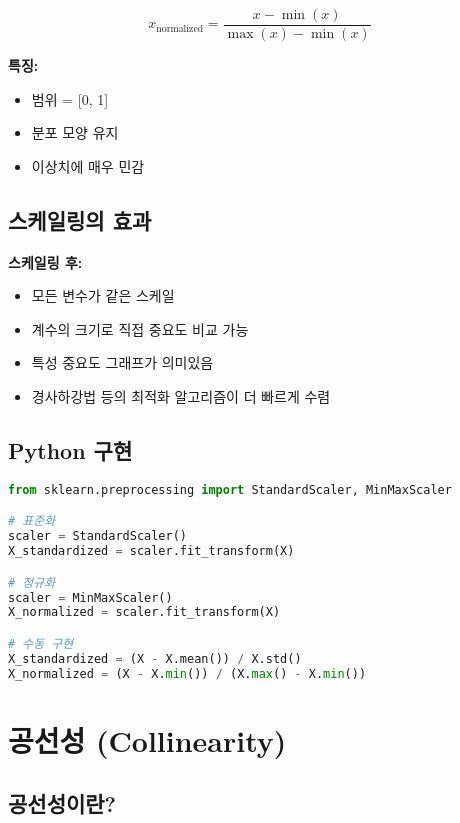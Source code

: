\documentclass[12pt]{article}
\begin{document}
\begin{equation}
x_{\text{normalized}} = \frac{x - \min(x)}{\max(x) - \min(x)}
\end{equation}

\textbf{특징:}
\begin{itemize}
    \item 범위 = [0, 1]
    \item 분포 모양 유지
    \item 이상치에 매우 민감
\end{itemize}

\subsection{스케일링의 효과}

\textbf{스케일링 후:}
\begin{itemize}
    \item 모든 변수가 같은 스케일
    \item 계수의 크기로 직접 중요도 비교 가능
    \item 특성 중요도 그래프가 의미있음
    \item 경사하강법 등의 최적화 알고리즘이 더 빠르게 수렴
\end{itemize}

\subsection{Python 구현}

\begin{lstlisting}[language=Python]
from sklearn.preprocessing import StandardScaler, MinMaxScaler

# 표준화
scaler = StandardScaler()
X_standardized = scaler.fit_transform(X)

# 정규화
scaler = MinMaxScaler()
X_normalized = scaler.fit_transform(X)

# 수동 구현
X_standardized = (X - X.mean()) / X.std()
X_normalized = (X - X.min()) / (X.max() - X.min())
\end{lstlisting}

\section{공선성 (Collinearity)}

\subsection{공선성이란?}
\end{document}

